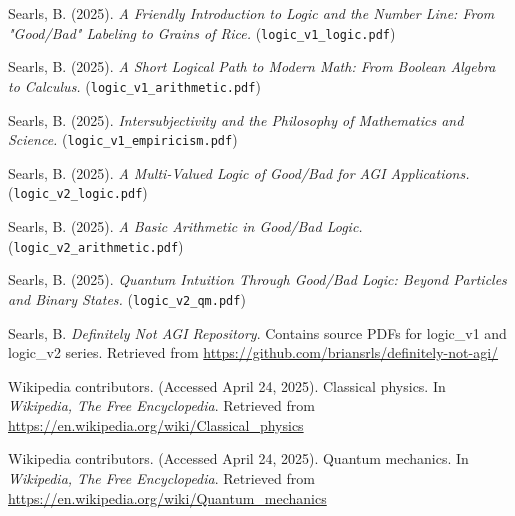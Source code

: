 \documentclass{article}
\begin{document}
\begin{thebibliography}{9} %

 Searls, B. (2025). \textit{A Friendly Introduction to Logic and the Number Line: From "Good/Bad" Labeling to Grains of Rice.} (\texttt{logic\_v1\_logic.pdf})

 Searls, B. (2025). \textit{A Short Logical Path to Modern Math: From Boolean Algebra to Calculus.} (\texttt{logic\_v1\_arithmetic.pdf})

 Searls, B. (2025). \textit{Intersubjectivity and the Philosophy of Mathematics and Science.} (\texttt{logic\_v1\_empiricism.pdf})

 Searls, B. (2025). \textit{A Multi-Valued Logic of Good/Bad for AGI Applications.} (\texttt{logic\_v2\_logic.pdf})

 Searls, B. (2025). \textit{A Basic Arithmetic in Good/Bad Logic.} (\texttt{logic\_v2\_arithmetic.pdf})

 Searls, B. (2025). \textit{Quantum Intuition Through Good/Bad Logic: Beyond Particles and Binary States.} (\texttt{logic\_v2\_qm.pdf}) %

 Searls, B. \textit{Definitely Not AGI Repository}. Contains source PDFs for logic\_v1 and logic\_v2 series. Retrieved from \url{https://github.com/briansrls/definitely-not-agi/}

 Wikipedia contributors. (Accessed April 24, 2025). Classical physics. In \textit{Wikipedia, The Free Encyclopedia}. Retrieved from \url{https://en.wikipedia.org/wiki/Classical_physics}

 Wikipedia contributors. (Accessed April 24, 2025). Quantum mechanics. In \textit{Wikipedia, The Free Encyclopedia}. Retrieved from \url{https://en.wikipedia.org/wiki/Quantum_mechanics}

\end{thebibliography}
\end{document}
